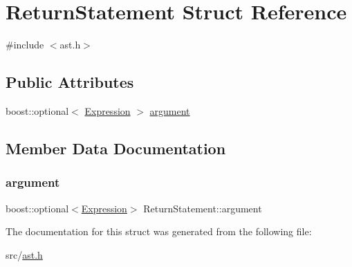 \hypertarget{struct_return_statement}{}\section{Return\+Statement Struct Reference}
\label{struct_return_statement}


{\ttfamily \#include $<$ast.\+h$>$}

\subsection*{Public Attributes}
\begin{DoxyCompactItemize}
\item 
boost\+::optional$<$ \hyperlink{ast_8h_a4cb273a4d960cd13ea17d08f254493e8}{Expression} $>$ \hyperlink{struct_return_statement_af307317cfa8d6d977cec648f68e98289}{argument}
\end{DoxyCompactItemize}


\subsection{Member Data Documentation}
\mbox{\label{struct_return_statement_af307317cfa8d6d977cec648f68e98289}} 
\subsubsection{\texorpdfstring{argument}{argument}}
{\footnotesize\ttfamily boost\+::optional$<$\hyperlink{ast_8h_a4cb273a4d960cd13ea17d08f254493e8}{Expression}$>$ Return\+Statement\+::argument}



The documentation for this struct was generated from the following file\+:\begin{DoxyCompactItemize}
\item 
src/\hyperlink{ast_8h}{ast.\+h}\end{DoxyCompactItemize}
